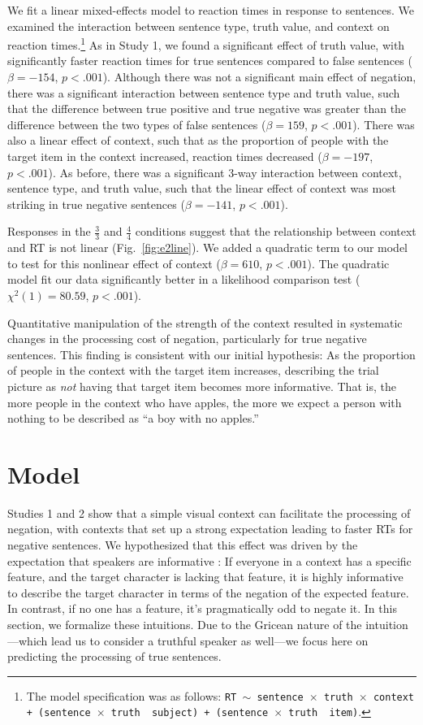 \documentclass[10pt,letterpaper]{article}
\begin{document}
We fit a linear mixed-effects model to reaction times in response to sentences.  We examined the interaction between sentence type, truth value, and context on reaction times.\footnote{The model specification was as follows: \texttt{RT $\sim$ sentence~$\times$~truth~$\times$~context + (sentence~$\times$~truth~\textbar~subject) +  (sentence~$\times$~truth~\textbar~item)}.}  As in Study 1, we found a significant effect of truth value, with significantly faster reaction times for true sentences compared to false sentences ($\beta= -154$, $p< .001$).  Although there was not a significant main effect of negation, there was a significant interaction between sentence type and truth value, such that the difference between true positive and true negative was greater than the difference between the two types of false sentences ($\beta= 159$, $p< .001$).  There was also a linear effect of context, such that as the proportion of people with the target item in the context increased, reaction times decreased ($\beta= -197$, $p< .001$).  As before, there was a significant 3-way interaction between context, sentence type, and truth value, such that the linear effect of context was most striking in true negative sentences ($\beta= -141$, $p< .001$).

Responses in the $\frac{3}{3}$ and $\frac{4}{4}$ conditions suggest that the relationship between context and RT is not linear (Fig.\ \ref{fig:e2line}).  We added a quadratic term to our model to test for this nonlinear effect of context ($\beta= 610 $, $p< .001$).  The quadratic model fit our data significantly better in a likelihood comparison test ($\chi^{2}(1) =80.59$, $p<.001$).  

Quantitative manipulation of the strength of the context resulted in systematic changes in the processing cost of negation, particularly for true negative sentences.  This finding is consistent with our initial hypothesis: As the proportion of people in the context with the target item increases, describing the trial picture as \emph{not} having that target item becomes more informative.  That is, the more people in the context who have apples, the more we expect a person with nothing to be described as ``a boy with no apples.'' 


\section{Model}

Studies 1 and 2 show that a simple visual context can facilitate the processing of negation, with contexts that set up a strong expectation leading to faster RTs for negative sentences.  We hypothesized that this effect was driven by the expectation that speakers are informative \cite{grice1975,frank2012}: If everyone in a context has a specific feature, and the target character is lacking that feature, it is highly informative to describe the target character in terms of the negation of the expected feature. In contrast, if no one has a feature, it's pragmatically odd to negate it. In this section, we formalize these intuitions. Due to the Gricean nature of the intuition---which lead us to consider a truthful speaker as well---we focus here on predicting the processing of true sentences.   
\end{document}
